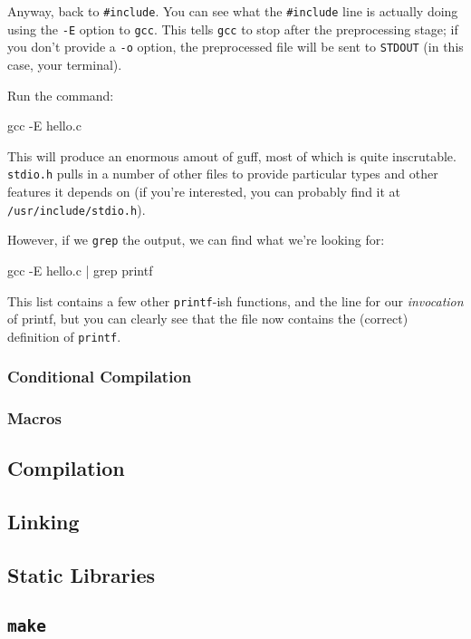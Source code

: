 \documentclass[a4paper,10pt]{article}
\newcommand{\kw}[1]{\texttt{#1}}
\newcommand{\cfile}[1]{\texttt{#1}}
\newcommand{\tool}[1]{\texttt{#1}}
\begin{document}
Anyway, back to \verb!#include!. You can see what the \verb!#include!
  line is actually doing using the \kw{-E} option to \tool{gcc}. This
  tells \tool{gcc} to stop after the preprocessing stage; if you don't
  provide a \kw{-o} option, the preprocessed file will be sent to
  \kw{STDOUT} (in this case, your terminal).

Run the command:

\bash[script]
gcc -E hello.c
\END

\noindent
This will produce an enormous amout of guff, most of which is quite
inscrutable. \cfile{stdio.h} pulls in a number of other files to
provide particular types and other features it depends on (if you're
interested, you can probably find it at \cfile{/usr/include/stdio.h}).

However, if we \tool{grep} the output, we can find what we're looking
for:

gcc -E hello.c | grep printf
\END

\noindent
This list contains a few other \kw{printf}-ish functions, and the line
for our \emph{invocation} of printf, but you can clearly see that the
file now contains the (correct) definition of \kw{printf}.

\subsubsection{Conditional Compilation}

\subsubsection{Macros}

\subsection{Compilation}

\subsection{Linking}

\subsection{Static Libraries}

\subsection{\tool{make}}
\label{sec:make}
\end{document}
